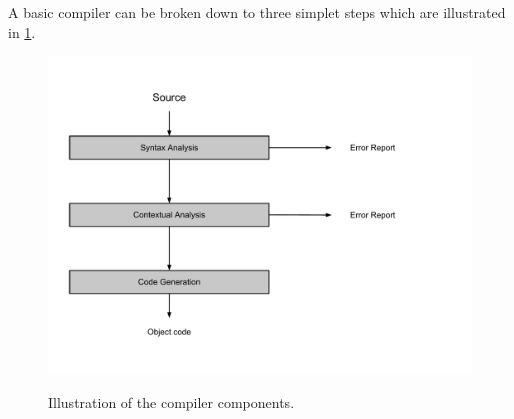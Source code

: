 A basic compiler can be broken down to three simplet steps which are illustrated in \ref{fig:compiler}.

\begin{figure}[H]
\begin{center}
\includegraphics[scale=0.6]{Images/compiler_drawing.pdf}
\label{fig:compiler}
\caption{Illustration of the compiler components.}
\end{center}
\end{figure}